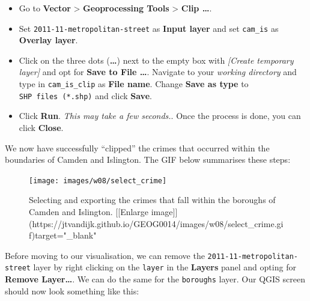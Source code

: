 \documentclass[
]{book}
\providecommand{\tightlist}{%
  \setlength{\itemsep}{0pt}\setlength{\parskip}{0pt}}
\begin{document}
\begin{itemize}
\tightlist
\item
  Go to \textbf{Vector} \textgreater{} \textbf{Geoprocessing Tools} \textgreater{} \textbf{Clip \ldots{}}.
\item
  Set \texttt{2011-11-metropolitan-street} as \textbf{Input layer} and set \texttt{cam\_is} as \textbf{Overlay layer}.
\item
  Click on the three dots (\textbf{\ldots{}}) next to the empty box with \emph{{[}Create temporary layer{]}} and opt for \textbf{Save to File \ldots{}}. Navigate to your \emph{working directory} and type in \texttt{cam\_is\_clip} as \textbf{File name}. Change \textbf{Save as type} to \texttt{SHP\ files\ (*.shp)} and click \textbf{Save}.
\item
  Click \textbf{Run}. \emph{This may take a few seconds.}. Once the process is done, you can click \textbf{Close}.
\end{itemize}

We now have successfully ``clipped'' the crimes that occurred within the boundaries of Camden and Islington. The GIF below summarises these steps:

\begin{figure}

{\centering \texttt{[image: images/w08/select\_crime]} 

}

\caption{Selecting and exporting the crimes that fall within the boroughs of Camden and Islington. [[Enlarge image]](https://jtvandijk.github.io/GEOG0014/images/w08/select_crime.gif){target="_blank"}}\label{fig:select-crimes}
\end{figure}

Before moving to our visualisation, we can remove the \texttt{2011-11-metropolitan-street} layer by right clicking on the \texttt{layer} in the \textbf{Layers} panel and opting for \textbf{Remove Layer\ldots{}}. We can do the same for the \texttt{boroughs} layer. Our QGIS screen should now look something like this:
\end{document}
